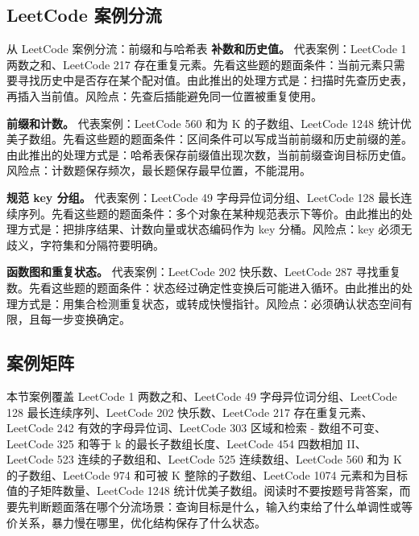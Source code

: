 \subsection{LeetCode 案例分流}

\begin{principlebox}{从 LeetCode 案例分流：前缀和与哈希表}
\textbf{补数和历史值。}
代表案例：LeetCode 1 两数之和、LeetCode 217 存在重复元素。先看这些题的题面条件：当前元素只需要寻找历史中是否存在某个配对值。由此推出的处理方式是：扫描时先查历史表，再插入当前值。风险点：先查后插能避免同一位置被重复使用。

\textbf{前缀和计数。}
代表案例：LeetCode 560 和为 K 的子数组、LeetCode 1248 统计优美子数组。先看这些题的题面条件：区间条件可以写成当前前缀和历史前缀的差。由此推出的处理方式是：哈希表保存前缀值出现次数，当前前缀查询目标历史值。风险点：计数题保存频次，最长题保存最早位置，不能混用。

\textbf{规范 key 分组。}
代表案例：LeetCode 49 字母异位词分组、LeetCode 128 最长连续序列。先看这些题的题面条件：多个对象在某种规范表示下等价。由此推出的处理方式是：把排序结果、计数向量或状态编码作为 key 分桶。风险点：key 必须无歧义，字符集和分隔符要明确。

\textbf{函数图和重复状态。}
代表案例：LeetCode 202 快乐数、LeetCode 287 寻找重复数。先看这些题的题面条件：状态经过确定性变换后可能进入循环。由此推出的处理方式是：用集合检测重复状态，或转成快慢指针。风险点：必须确认状态空间有限，且每一步变换确定。

\end{principlebox}

\subsection{案例矩阵}

本节案例覆盖 LeetCode 1 两数之和、LeetCode 49 字母异位词分组、LeetCode 128 最长连续序列、LeetCode 202 快乐数、LeetCode 217 存在重复元素、LeetCode 242 有效的字母异位词、LeetCode 303 区域和检索 - 数组不可变、LeetCode 325 和等于 k 的最长子数组长度、LeetCode 454 四数相加 II、LeetCode 523 连续的子数组和、LeetCode 525 连续数组、LeetCode 560 和为 K 的子数组、LeetCode 974 和可被 K 整除的子数组、LeetCode 1074 元素和为目标值的子矩阵数量、LeetCode 1248 统计优美子数组。阅读时不要按题号背答案，而要先判断题面落在哪个分流场景：查询目标是什么，输入约束给了什么单调性或等价关系，暴力慢在哪里，优化结构保存了什么状态。

